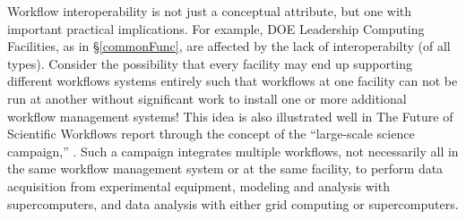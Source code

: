 Workflow interoperability is not just a conceptual attribute, but one with
important practical implications. For example, DOE Leadership Computing
Facilities, as in \S\ref{commonFunc}, are affected by the lack of
interoperabilty (of all types). Consider the possibility that every facility
may end up supporting different workflows systems entirely such that workflows
at one facility can not be run at another without significant work to install
one or more additional workflow management systems! This idea is also
illustrated well in The Future of Scientific Workflows report through the
concept of the ``large-scale science campaign,'' \cite{deelman_future_2015}.
Such a campaign integrates multiple workflows, not necessarily all in the same
workflow management system or at the same facility, to perform data
acquisition from experimental equipment, modeling and analysis with
supercomputers, and data analysis with either grid computing or
supercomputers.